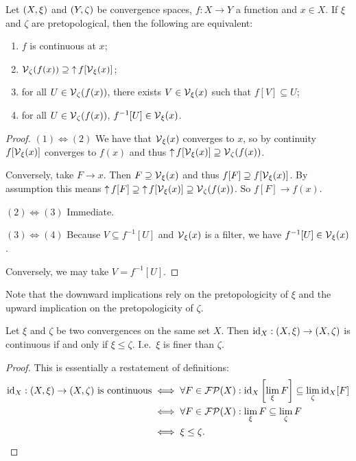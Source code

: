 \begin{proposition} \label{pretopologicalContinuityVicinities}
Let $\left( X,\xi \right)$ and $\left( Y,\zeta \right)$ be convergence spaces, $f: X\to Y$ a function and $x\in X$. If $\xi$ and $\zeta$ are pretopological, then the following are equivalent:
\begin{enumerate}
\item $f$ is continuous at $x$;
\item $\operatorname{\mathcal{V}}_\zeta(f(x)) \supseteq \operatorname{\uparrow} f[\operatorname{\mathcal{V}}_\xi(x)]$;
\item for all $U\in \operatorname{\mathcal{V}}_\zeta(f(x))$, there exists $V\in \operatorname{\mathcal{V}}_\xi(x)$ such that $f[V] \subseteq U$;
\item for all $U\in \operatorname{\mathcal{V}}_\zeta(f(x))$, $f^{-1}[U]\in \operatorname{\mathcal{V}}_\xi(x)$.
\end{enumerate}
\end{proposition}
\begin{proof}
$(1) \Leftrightarrow (2)$ We have that $\operatorname{\mathcal{V}}_\xi(x)$ converges to $x$, so by continuity $f[\operatorname{\mathcal{V}}_\xi(x)]$ converges to $f(x)$ and thus $\operatorname{\uparrow} f[\operatorname{\mathcal{V}}_\xi(x)] \supseteq \operatorname{\mathcal{V}}_\zeta(f(x))$.

Conversely, take $F\to x$. Then $F\supseteq \operatorname{\mathcal{V}}_\xi(x)$ and thus $f[F]\supseteq f[\operatorname{\mathcal{V}}_\xi(x)]$. By assumption this means $\operatorname{\uparrow} f[F]\supseteq \operatorname{\uparrow} f[\operatorname{\mathcal{V}}_\xi(x)]\supseteq \operatorname{\mathcal{V}}_\zeta(f(x))$. So $f[F]\to f(x)$.

$(2) \Leftrightarrow (3)$ Immediate.

$(3) \Leftrightarrow (4)$ Because $V\subseteq f^{-1}[U]$ and $\operatorname{\mathcal{V}}_\xi(x)$ is a filter, we have $f^{-1}[U] \in \operatorname{\mathcal{V}}_\xi(x)$.

Conversely, we may take $V = f^{-1}[U]$.
\end{proof}
Note that the downward implications rely on the pretopologicity of $\xi$ and the upward implication on the pretopologicity of $\zeta$.

\begin{lemma} \label{identityContinuity}
Let $\xi$ and $\zeta$ be two convergences on the same set $X$. Then $\operatorname{id}_X: \left( X,\xi \right) \to \left( X,\zeta \right)$ is continuous \textup{if and only if} $\xi \leq \zeta$. I.e.\ $\xi$ is finer than $\zeta$.
\end{lemma}
\begin{proof}
This is essentially a restatement of definitions:
\begin{align*}
\text{$\operatorname{id}_X: \left( X,\xi \right) \to \left( X,\zeta \right)$ is continuous} &\iff \forall F\in\operatorname{\mathcal{FP}}(X): \operatorname{id}_X\left[\lim_\xi F \right] \subseteq \lim_\zeta \operatorname{id}_X[F] \\
&\iff \forall F\in\operatorname{\mathcal{FP}}(X): \lim_\xi F \subseteq \lim_\zeta F \\
&\iff \xi \leq \zeta.
\end{align*}
\end{proof}

